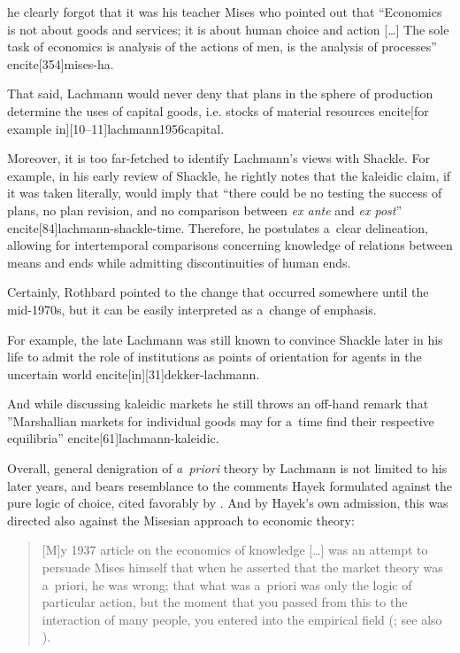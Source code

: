 {\begin{quote}
\end{quote}

he clearly forgot that it was his teacher Mises who pointed out that ``Economics is not about goods and services; it is about human choice and action [\ldots] The sole task of economics is analysis of the actions of men, is the analysis of processes'' encite[354]{mises-ha}.

That said, Lachmann would never deny that plans in the sphere of production determine the uses of capital goods, i.e. stocks of material resources encite[for example in][10--11]{lachmann1956capital}.



Moreover, it is too far-fetched to identify Lachmann's views with Shackle. For example, in his early review of Shackle, he rightly notes that the kaleidic claim, if it was taken literally, would imply that ``there could be no testing the success of plans, no plan revision, and no comparison between \emph{ex ante} and \emph{ex post}'' encite[84]{lachmann-shackle-time}. Therefore, he postulates a~clear delineation, allowing for intertemporal comparisons concerning knowledge of relations between means and ends while admitting discontinuities of human ends.

Certainly, Rothbard pointed to the change that occurred somewhere until the mid-1970s, but it can be easily interpreted as a~change of emphasis.

For example, the late Lachmann was still known to convince Shackle later in his life to admit the role of institutions as points of orientation for agents in the uncertain world encite[in][31]{dekker-lachmann}.

And while discussing kaleidic markets he still throws an off-hand remark that ''Marshallian markets for individual goods may for a~time find their respective equilibria'' encite[61]{lachmann-kaleidic}.



Overall, general denigration of \emph{a~priori} theory by Lachmann is not limited to his later years, and bears resemblance to the comments Hayek formulated against the pure logic of choice, cited favorably by \textcite[57]{lachmann-significance}. And by Hayek's own admission, this was directed also against the Misesian approach to economic theory:

\begin{quote}

[M]y 1937 article on the economics of knowledge [\ldots] was an attempt to persuade Mises himself that when he asserted that the market theory was a~priori, he was wrong; that what was a~priori was only the logic of particular action, but the moment that you passed from this to the interaction of many people, you entered into the empirical field (\cite[72]{hayek-on-hayek}; see also \cite[Lachmann quoted in][35]{selgin}).


\end{quote}}
